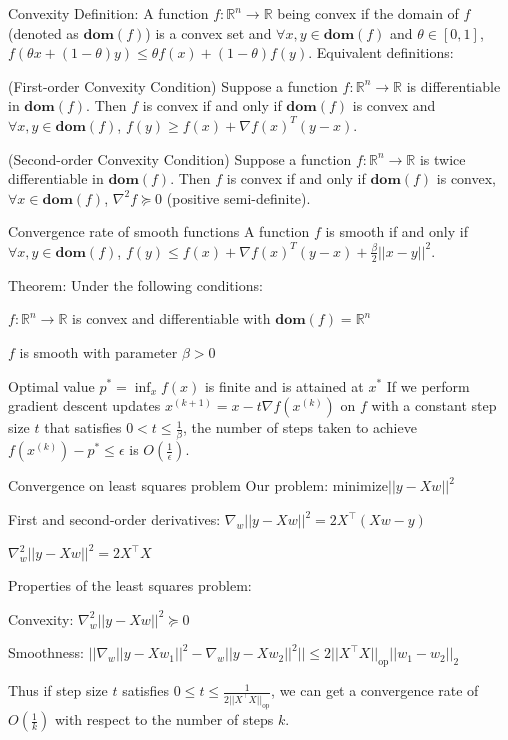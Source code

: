 \begin{frame}{Convexity}
Definition: A function $f: \mathbb{R}^n \rightarrow \mathbb{R}$ being convex if the domain of $f$ (denoted as $\textbf{dom}(f)$) is a convex set and $\forall x, y \in \textbf{dom}(f)$ and $\theta \in [0,1]$, $f(\theta x + (1- \theta)y) \leq \theta f(x) + (1- \theta)f(y)$.
\vfill
\pause
Equivalent definitions:
\bit
\item (First-order Convexity Condition) Suppose a function $f: \mathbb{R}^n \rightarrow \mathbb{R}$ is differentiable in $\textbf{dom}(f)$. Then $f$ is convex if and only if $\textbf{dom}(f)$ is convex and $\forall x, y \in \textbf{dom}(f)$, $f(y) \geq f(x) + \nabla f(x)^{T}(y-x)$.
\item (Second-order Convexity Condition) Suppose a function $f: \mathbb{R}^n \rightarrow \mathbb{R}$ is twice differentiable in $\textbf{dom}(f)$. Then $f$ is convex if and only if $\textbf{dom}(f)$ is convex, $\forall x \in \textbf{dom}(f)$, $\nabla^2 f \succeq 0$ (positive semi-definite).
\eit
\end{frame}

\begin{frame}{Convergence rate of smooth functions}
A function $f$ is smooth if and only if $\forall x, y \in \textbf{dom}(f)$, $f(y) \leq f(x) + \nabla f(x)^{T}(y-x) + \frac{\beta}{2}||x-y||^2$.

\vfill

\pause
Theorem: Under the following conditions:
\ben
	\item $f: \mathbb{R}^n \rightarrow \mathbb{R}$ is convex and differentiable with $\textbf{dom}(f) = \mathbb{R}^n$
	\item $f$ is smooth with parameter $\beta >0$
	\item  Optimal value $p^{*}=\inf_x f(x)$ is finite and is attained at $x^{*}$
\een
If we perform gradient descent updates $x^{(k+1)} = x - t \nabla f(x^{(k)}) $ on $f$ with a constant step size $t$ that satisfies $0 < t \leq \frac{1}{\beta}$, the number of steps taken to achieve $f(x^{(k)})-p^* \leq \epsilon$ is $O(\frac{1}{\epsilon})$.

\end{frame}

\begin{frame}{Convergence on least squares problem}
Our problem: $\text{minimize} ||y-Xw||^2$

\vfill
First and second-order derivatives: 
$\nabla_w ||y-Xw||^2 = 2X^\top (Xw-y)$

$\nabla^2_w ||y-Xw||^2 = 2X^\top X$

\vfill
Properties of the least squares problem:
\bit
\item Convexity: $\nabla^2_w ||y-Xw||^2 \succeq 0$
\item Smoothness: $||\nabla_w ||y-Xw_1||^2 - \nabla_w ||y-Xw_2||^2|| \leq 2||X^\top X||_\text{op} ||w_1 - w_2||_2$
\eit

Thus if step size $t$ satisfies $0 \leq t \leq \frac{1}{2||X^\top X||_\text{op}}$, we can get a convergence rate of $O(\frac{1}{k})$ with respect to the number of steps $k$.

\end{frame}
%